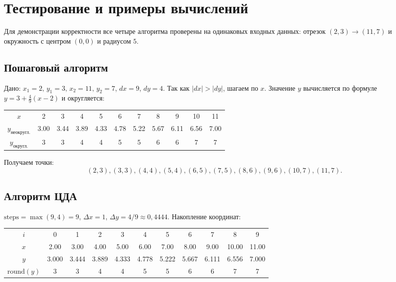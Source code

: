 \documentclass[a4paper,14pt]{extarticle}
\begin{document}
\section{Тестирование и примеры вычислений}

Для демонстрации корректности все четыре алгоритма проверены на одинаковых входных данных: отрезок $(2,3) \to (11,7)$ и окружность с центром $(0,0)$ и радиусом $5$.

\subsection{Пошаговый алгоритм}
Дано: $x_1=2,\,y_1=3,\,x_2=11,\,y_2=7$, $dx=9$, $dy=4$. Так как $|dx|>|dy|$, шагаем по $x$. Значение $y$ вычисляется по формуле $y = 3 + \tfrac{4}{9}(x-2)$ и округляется:

\begin{center}
\begin{tabular}{ccccccccccc}
\toprule
$x$ & 2 & 3 & 4 & 5 & 6 & 7 & 8 & 9 & 10 & 11\\
$y_{\text{неокругл.}}$ & 3.00 & 3.44 & 3.89 & 4.33 & 4.78 & 5.22 & 5.67 & 6.11 & 6.56 & 7.00\\
$y_{\text{округл.}}$ & 3 & 3 & 4 & 4 & 5 & 5 & 6 & 6 & 7 & 7\\
\bottomrule
\end{tabular}
\end{center}

Получаем точки:
\[
(2,3), (3,3), (4,4), (5,4), (6,5), (7,5), (8,6), (9,6), (10,7), (11,7).
\]

\subsection{Алгоритм ЦДА}
$\mathrm{steps} = \max(9,4) = 9$, $\Delta x = 1$, $\Delta y = 4/9 \approx 0{,}4444$.
Накопление координат:
\begin{center}
\begin{tabular}{ccccccccccc}
\toprule
$i$ & 0 & 1 & 2 & 3 & 4 & 5 & 6 & 7 & 8 & 9\\
$x$ & 2.00 & 3.00 & 4.00 & 5.00 & 6.00 & 7.00 & 8.00 & 9.00 & 10.00 & 11.00\\
$y$ & 3.000 & 3.444 & 3.889 & 4.333 & 4.778 & 5.222 & 5.667 & 6.111 & 6.556 & 7.000\\
$\mathrm{round}(y)$ & 3 & 3 & 4 & 4 & 5 & 5 & 6 & 6 & 7 & 7\\
\bottomrule
\end{tabular}
\end{center}
\end{document}
